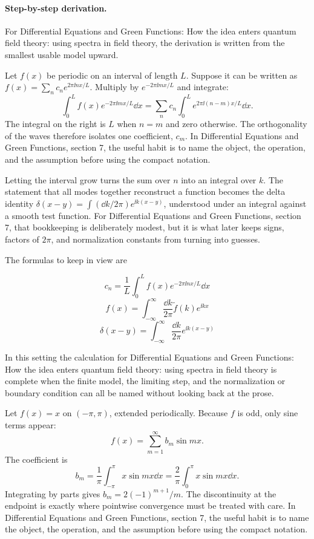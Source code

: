 \paragraph{Step-by-step derivation.}

For Differential Equations and Green Functions: How the idea enters quantum field theory: using spectra in field theory, the derivation is written from the smallest usable model upward.

Let \(f(x)\) be periodic on an interval of length \(L\).  Suppose it can be written as \(f(x)=\sum_n c_ne^{2\pi\ii nx/L}\).  Multiply by \(e^{-2\pi\ii mx/L}\) and integrate:
\[
  \int_0^L f(x)e^{-2\pi\ii mx/L}\dd x
  =
  \sum_n c_n\int_0^L e^{2\pi\ii(n-m)x/L}\dd x.
\]
The integral on the right is \(L\) when \(n=m\) and zero otherwise.  The orthogonality of the waves therefore isolates one coefficient, \(c_m\).  In Differential Equations and Green Functions, section 7, the useful habit is to name the object, the operation, and the assumption before using the compact notation.

Letting the interval grow turns the sum over \(n\) into an integral over \(k\).  The statement that all modes together reconstruct a function becomes the delta identity \(\delta(x-y)=\int(\dd k/2\pi)e^{\ii k(x-y)}\), understood under an integral against a smooth test function.  For Differential Equations and Green Functions, section 7, that bookkeeping is deliberately modest, but it is what later keeps signs, factors of \(2\pi\), and normalization constants from turning into guesses.

The formulas to keep in view are

\[
  c_n=\frac1L\int_0^L f(x)e^{-2\pi\ii nx/L}\dd x
\]
\[
  f(x)=\int_{-\infty}^{\infty}\frac{\dd k}{2\pi}\tilde f(k)e^{\ii kx}
\]
\[
  \delta(x-y)=\int_{-\infty}^{\infty}\frac{\dd k}{2\pi}e^{\ii k(x-y)}
\]

In this setting the calculation for Differential Equations and Green Functions: How the idea enters quantum field theory: using spectra in field theory is complete when the finite model, the limiting step, and the normalization or boundary condition can all be named without looking back at the prose.




\begin{example}
Let \(f(x)=x\) on \((-\pi,\pi)\), extended periodically.  Because \(f\) is odd, only sine terms appear:
\[
  f(x)=\sum_{m=1}^\infty b_m\sin mx.
\]
The coefficient is
\[
  b_m=\frac1\pi\int_{-\pi}^\pi x\sin mx\dd x
  =\frac2\pi\int_0^\pi x\sin mx\dd x.
\]
Integrating by parts gives \(b_m=2(-1)^{m+1}/m\).  The discontinuity at the endpoint is exactly where pointwise convergence must be treated with care.  In Differential Equations and Green Functions, section 7, the useful habit is to name the object, the operation, and the assumption before using the compact notation.
\end{example}



